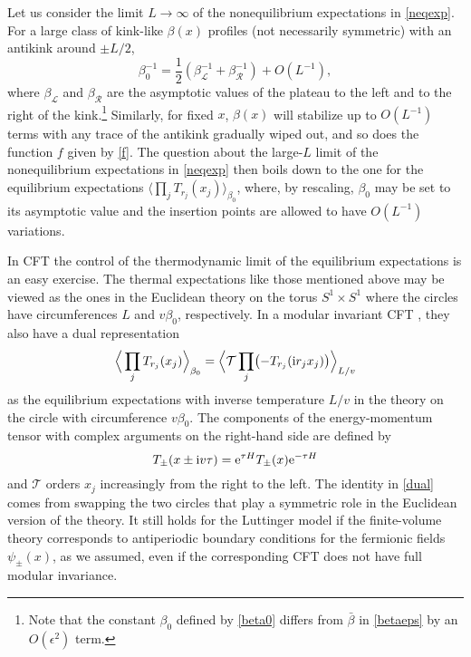 \documentclass[12pt,a4paper]{article}
\newcommand{\SL}{S^1}
\newcommand{\ee}{{\rm e}}
\newcommand{\ii}{{\rm i}}
\newcommand{\cL}{\mathcal{L}}
\newcommand{\cR}{\mathcal{R}}
\newcommand{\cT}{\mathcal{T}}
\theoremstyle{definition}
\theoremstyle{remark}
\begin{document}
Let us consider the limit $L\to\infty$ of the nonequilibrium expectations in \eqref{neqexp}. For a large class of kink-like $\beta(x)$ profiles (not necessarily symmetric) with an antikink around $\pm L/2$,
%
\begin{equation}
\beta_0^{-1} = \frac{1}{2} \left( \beta_{\cL}^{-1}+\beta_{\cR}^{-1} \right) + O(L^{-1}),
\end{equation}
%
where $\beta_{\cL}$ and $\beta_{\cR}$ are the asymptotic values of the plateau to the left and to the right of the kink.\footnote{Note that the constant $\beta_0$ defined by \eqref{beta0} differs from $\bar\beta$ in \eqref{betaeps} by an $O(\epsilon^2)$ term.}
Similarly, for fixed $x$, $\beta(x)$ will stabilize up to $O(L^{-1})$ terms with any trace of the antikink gradually wiped out, and so does the function
$f$ given by \eqref{f}.
The question about the large-$L$ limit of the nonequilibrium expectations in \eqref{neqexp} then boils down to the one for the equilibrium expectations
$\big\langle \prod_{j} T_{r_j}(x_j) \big\rangle_{\beta_0}$,
where, by rescaling, $\beta_0$ may be set to its asymptotic value and the insertion points are allowed to have $O(L^{-1})$ variations.

In CFT the control of the thermodynamic limit of the equilibrium expectations is an easy exercise.
The thermal expectations like those mentioned above may be viewed as the ones in the Euclidean theory on the torus
$\SL\times\SL$ where the circles have circumferences $L$ and $v\beta_0$, respectively.
In a modular invariant CFT \cite{FMS}, they also have a dual representation
%
\begin{equation}
\label{dual}
\Big\langle \prod_{j} T_{r_j}(x_j) \Big\rangle_{\beta_0}  
= \Big\langle \cT \prod_{j} \bigl(-T_{r_j}(\ii r_jx_j)\bigr) \Big\rangle_{L/v}
\end{equation}
%
as the equilibrium expectations with inverse temperature $L/v$ in the theory on the circle with circumference $v\beta_0$.
The components of the energy-momentum tensor with complex arguments on the right-hand side are defined by
%
\begin{equation}
T_{\pm}(x\pm\ii v\tau)=\ee^{\tau H}T_{\pm}(x)\ee^{-\tau H}
\end{equation}
%
and $\cT$ orders $x_j$ increasingly from the right to the left.
The identity in \eqref{dual} comes from swapping the two circles that play a symmetric role in the Euclidean version of the theory. 
It still holds for the Luttinger model if the finite-volume theory corresponds to antiperiodic boundary conditions for the fermionic fields $\psi_{\pm}(x)$, as
we assumed, even if the corresponding CFT does not have full modular
invariance.
\end{document}
